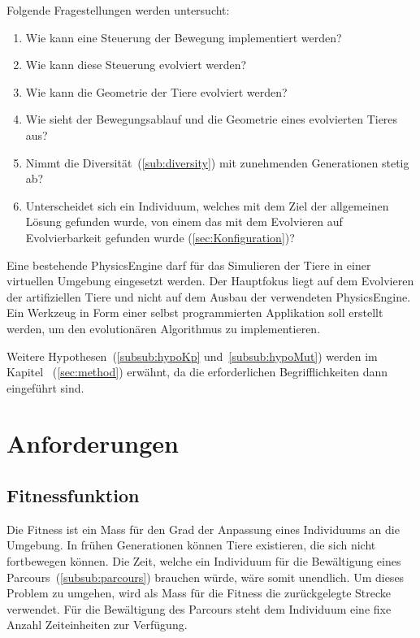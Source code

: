     Folgende Fragestellungen werden untersucht:

    \begin{enumerate}
      \item Wie kann eine Steuerung der Bewegung implementiert werden?\label{item:frageSteuerungBeine}
      \item Wie kann diese Steuerung evolviert werden?
      \item Wie kann die Geometrie der Tiere evolviert werden?
      \item Wie sieht der Bewegungsablauf und die Geometrie eines evolvierten Tieres aus?
      \item Nimmt die Diversität~(\vref{sub:diversity}) mit zunehmenden Generationen stetig ab?
      \item Unterscheidet sich ein Individuum, welches mit dem Ziel der allgemeinen Lösung gefunden wurde,
            von einem das mit dem Evolvieren auf Evolvierbarkeit gefunden wurde (\vref{sec:Konfiguration})?
    \end{enumerate}

    Eine bestehende \gls{PhysicsEngine} darf für das Simulieren der Tiere in einer virtuellen Umgebung eingesetzt werden.
    Der Hauptfokus liegt auf dem Evolvieren der artifiziellen Tiere und
    nicht auf dem Ausbau der verwendeten \gls{PhysicsEngine}.
    Ein Werkzeug in Form einer selbst programmierten Applikation soll erstellt werden,
    um den evolutionären Algorithmus zu implementieren.

    \medskip

    Weitere Hypothesen~(\vref{subsub:hypoKp} und~\vref{subsub:hypoMut})
    werden im Kapitel ~(\vref{sec:method}) erwähnt,
    da die erforderlichen Begrifflichkeiten dann eingeführt sind.

  \section{Anforderungen}

    \subsection{Fitnessfunktion\label{sub:reqFitness}}

      Die Fitness ist ein Mass für den Grad der Anpassung eines Individuums an die Umgebung.
      In frühen Generationen können Tiere existieren, die sich nicht fortbewegen können.
      Die Zeit, welche ein Individuum für die Bewältigung eines Parcours~(\vref{subsub:parcours}) brauchen würde,
      wäre somit unendlich.
      Um dieses Problem zu umgehen, wird als Mass für die Fitness die zurückgelegte Strecke verwendet.
      Für die Bewältigung des Parcours steht dem Individuum eine fixe Anzahl Zeiteinheiten zur Verfügung.

